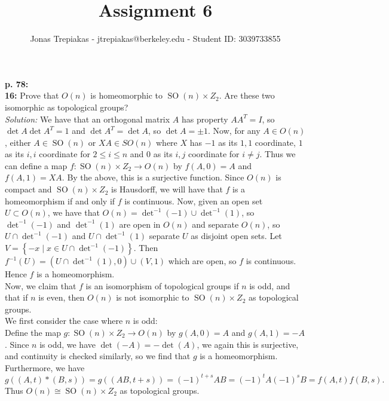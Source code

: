 \documentclass[a4paper]{article}
\title{Assignment 6}
\author{Jonas Trepiakas - jtrepiakas@berkeley.edu - Student ID: 3039733855}
\date{}
\DeclareMathOperator{\SO}{SO}
\begin{document}
\maketitle
\newpage
    
\textbf{p. 78:}\\
\textbf{16:} Prove that $O(n)$ is homeomorphic to 
$\SO (n) \times Z_2$. Are these two isomorphic as topological groups?\\
\linebreak
\textit{Solution:} 
We have that an orthogonal matrix $A$ has property
$A A^{T} = I$, so $\det A \det A^{T} = 1$ and
$\det A^{T} = \det A$, so $\det A = \pm 1$. Now, for any
$A \in O(n)$, either $A \in \SO (n)$ or $X A \in SO (n)$ where
$X$ has $-1$ as its $1,1$ coordinate, $1$ as its $i,i$ coordinate for
$2 \le i \le n$ and $0$ as its $i,j$ coordinate for $i \neq j$. Thus we can
define a map
$f  \colon \SO (n) \times Z_2 \to O(n)$ by
$f(A,0) = A$ and $f(A,1) = X A$. By the above, this is a surjective function. 
Since $O(n)$ is compact and  $\SO (n) \times Z_2$ is Hausdorff, we will have
that
$f$ is a homeomorphism if and only if  $f$ is continuous. Now, given
an open set $U \subset O(n)$, we have that
$O(n) = \det^{-1}(-1) \cup \det^{-1}(1)$, so
$\det^{-1}(-1)$ and $\det^{-1}(1)$ are open in $O(n)$ and separate $O(n)$, so
$U \cap \det^{-1}(-1)$ and $U \cap \det^{-1}(1)$ separate $U$ as disjoint open
sets. Let $V = \left\{ -x  \mid x \in U \cap \det^{-1}(-1) \right\} $. Then
$f^{-1}(U) = (U \cap \det^{-1}(1), 0) \cup (V, 1)$ which are open, so
$f$ is continuous. Hence $f$ is a homeomorphism.\\
\linebreak
Now, we claim that
$f$ is an isomorphism of topological groups if $n$ is odd, and that
if $n$ is even, then $O(n)$ is not isomorphic to $\SO (n) \times Z_2$ as
topological groups.\\
\linebreak
We first consider the case where $n$ is odd:\\
Define the map $g  \colon \SO (n) \times Z_2 \to O(n)$ by
$g(A,0) = A$ and $g(A,1) = -A$. Since $n$ is odd, we have
$\det (-A) = - \det (A)$, we again this is surjective, and continuity is
checked similarly, so we find that $g$ is a homeomorphism.\\
Furthermore, we have
 \[
g \left( (A,t) * (B,s) \right) 
= g \left( (AB, t+s) \right) 
= (-1)^{t+s} AB
= (-1)^{t} A (-1)^{s}B
= f(A,t) f(B,s).
\] 
Thus $O(n) \cong \SO(n) \times Z_2$ as topological groups.\\
\linebreak
\end{document}
